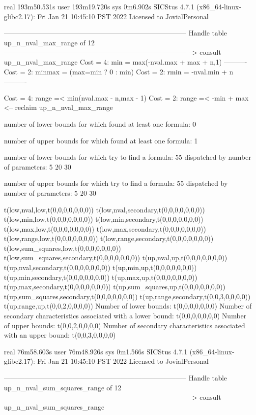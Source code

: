 real	193m50.531s
user	193m19.720s
sys	0m6.902s
SICStus 4.7.1 (x86_64-linux-glibc2.17): Fri Jan 21 10:45:10 PST 2022
Licensed to JovialPersonal


--------------------------------------------------------------------------------
Handle table up_n_nval_max_range of 12
--------------------------------------------------------------------------------
--> consult up_n_nval_max_range
Cost =  4:  min    = max(-nval.max + max + n,1)
----------
Cost =  2:  minmax = (max=min ? 0 : min)
Cost =  2:  rmin   = -nval.min + n
----------

Cost =  4:  range =< min(nval.max - n,max - 1)
Cost =  2:  range =< -min + max
<-- reclaim up_n_nval_max_range

number of lower bounds for which found at least one formula: 0

number of upper bounds for which found at least one formula: 1

number of lower bounds for which try to find a formula: 55
dispatched by number of parameters: 5  20  30

number of upper bounds for which try to find a formula: 55
dispatched by number of parameters: 5  20  30

t(low,nval,low,t(0,0,0,0,0,0,0))
t(low,nval,secondary,t(0,0,0,0,0,0,0))
t(low,min,low,t(0,0,0,0,0,0,0))
t(low,min,secondary,t(0,0,0,0,0,0,0))
t(low,max,low,t(0,0,0,0,0,0,0))
t(low,max,secondary,t(0,0,0,0,0,0,0))
t(low,range,low,t(0,0,0,0,0,0,0))
t(low,range,secondary,t(0,0,0,0,0,0,0))
t(low,sum_squares,low,t(0,0,0,0,0,0,0))
t(low,sum_squares,secondary,t(0,0,0,0,0,0,0))
t(up,nval,up,t(0,0,0,0,0,0,0))
t(up,nval,secondary,t(0,0,0,0,0,0,0))
t(up,min,up,t(0,0,0,0,0,0,0))
t(up,min,secondary,t(0,0,0,0,0,0,0))
t(up,max,up,t(0,0,0,0,0,0,0))
t(up,max,secondary,t(0,0,0,0,0,0,0))
t(up,sum_squares,up,t(0,0,0,0,0,0,0))
t(up,sum_squares,secondary,t(0,0,0,0,0,0,0))
t(up,range,secondary,t(0,0,3,0,0,0,0))
t(up,range,up,t(0,0,2,0,0,0,0))
Number of lower bounds:                                             t(0,0,0,0,0,0,0)
Number of secondary characteristics associated with a lower bound:  t(0,0,0,0,0,0,0)
Number of upper bounds:                                             t(0,0,2,0,0,0,0)
Number of secondary characteristics associated with an upper bound: t(0,0,3,0,0,0,0)

real	76m58.603s
user	76m48.926s
sys	0m1.566s
SICStus 4.7.1 (x86_64-linux-glibc2.17): Fri Jan 21 10:45:10 PST 2022
Licensed to JovialPersonal


--------------------------------------------------------------------------------
Handle table up_n_nval_sum_squares_range of 12
--------------------------------------------------------------------------------
--> consult up_n_nval_sum_squares_range

